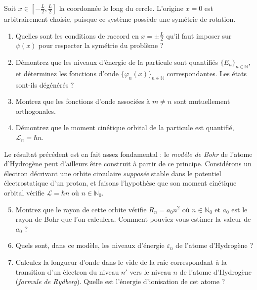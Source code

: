 \begin{center}
\end{center}
$ $\\
Soit $x \in [-\frac{L}{2},\frac{L}{2}]$ la coordonnée le long du cercle. L'origine $x=0$ est arbitrairement choisie, puisque ce système possède une symétrie de rotation.

\begin{enumerate}
    \item Quelles sont les conditions de raccord en $x= \pm \frac{L}{2}$ qu'il faut imposer sur $\psi(x)$ pour respecter la symétrie du problème ?
    \item Démontrez que les niveaux d'énergie de la particule sont quantifiés $\lbrace E_n\rbrace_{n\in\mathbb N}$, et déterminez les fonctions d'onde $\lbrace \varphi_n(x)\rbrace_{n\in\mathbb N}$ correspondantes. Les états sont-ils dégénérés ?
    \item Montrez que les fonctions d'onde associées à $m\neq n$ sont mutuellement orthogonales.
    \item Démontrez que le moment cinétique orbital de la particule est quantifié, $\mathcal L_n = \hbar n$.
    \end{enumerate}
    Le résultat précédent est en fait assez fondamental : le \textit{modèle de Bohr} de l'atome d'Hydrogène peut d'ailleurs être construit à partir de ce principe. Considérons un électron décrivant une orbite circulaire \textit{supposée} stable dans le potentiel électrostatique d'un proton, et faisons l'hypothèse que son moment cinétique orbital vérifie $\mathcal L = \hbar n$ où $n\in \mathbb N_0$. 
    \begin{enumerate}
    \setcounter{enumi}{4}
    \item Montrez que le rayon de cette orbite vérifie $R_n = a_0 n^2$ où $n\in\mathbb N_0$ et $a_0$ est le rayon de Bohr que l'on calculera. Comment pouviez-vous estimer la valeur de $a_0$ ?
    \item Quels sont, dans ce modèle, les niveaux d'énergie $\varepsilon_n$ de l'atome d'Hydrogène ? 
    \item Calculez la longueur d'onde dans le vide de la raie correspondant à la transition d'un électron du niveau $n'$ vers le niveau $n$ de l'atome d'Hydrogène (\textit{formule de Rydberg}). Quelle est l'énergie d'ionisation de cet atome ? 
\end{enumerate} 

